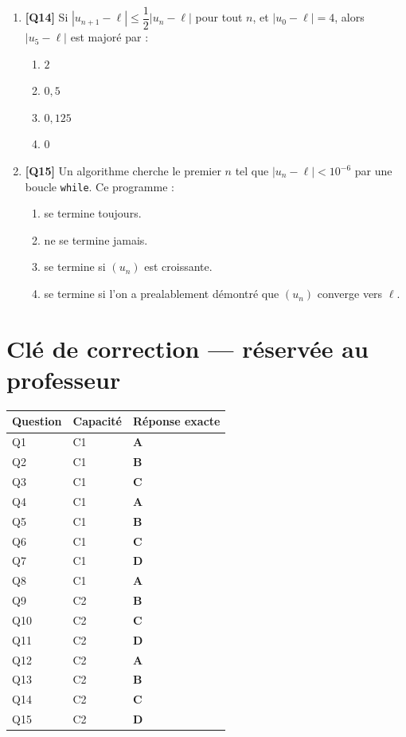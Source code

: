 \begin{enumerate}
\item \textbf{[Q14]} Si $\left|u_{n+1} - \ell\right| \leq \dfrac{1}{2}\left|u_n - \ell\right|$ pour tout $n$, et $\left|u_0 - \ell\right| = 4$, alors $\left|u_5 - \ell\right|$ est majoré par :
  \begin{enumerate}[label=\Alph*.]
    \item $2$
    \item $0{,}5$
    \item $0{,}125$
    \item $0$
  \end{enumerate}

\item \textbf{[Q15]} Un algorithme cherche le premier $n$ tel que $\left|u_n - \ell\right| < 10^{-6}$ par une boucle \verb|while|. Ce programme :
  \begin{enumerate}[label=\Alph*.]
    \item se termine toujours.
    \item ne se termine jamais.
    \item se termine si $(u_n)$ est croissante.
    \item se termine si l'on a prealablement démontré que $(u_n)$ converge vers $\ell$.
  \end{enumerate}

\end{enumerate}

\ifnxVersionProfesseur
\clearpage
\section*{Clé de correction — réservée au professeur}

\begin{center}
\begin{tabular}{lll}
\hline
Question & Capacité & Réponse exacte \\
\hline
Q1 & C1 & \textbf{A} \\
Q2 & C1 & \textbf{B} \\
Q3 & C1 & \textbf{C} \\
Q4 & C1 & \textbf{A} \\
Q5 & C1 & \textbf{B} \\
Q6 & C1 & \textbf{C} \\
Q7 & C1 & \textbf{D} \\
Q8 & C1 & \textbf{A} \\
Q9 & C2 & \textbf{B} \\
Q10 & C2 & \textbf{C} \\
Q11 & C2 & \textbf{D} \\
Q12 & C2 & \textbf{A} \\
Q13 & C2 & \textbf{B} \\
Q14 & C2 & \textbf{C} \\
Q15 & C2 & \textbf{D} \\
\hline
\end{tabular}
\end{center}

